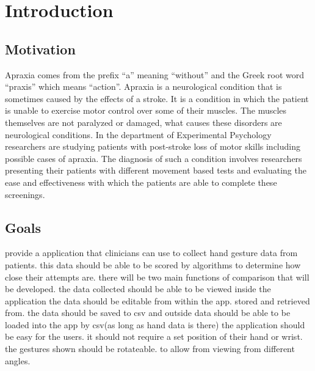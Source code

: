 \chapter{Introduction}

\label{Chapter1_introduction} 

\section{Motivation}
Apraxia comes from the prefix “a” meaning “without” and the  Greek root word “praxis” which means “action”. Apraxia is a neurological condition that is sometimes caused by the effects of a stroke. It is a condition in which the patient is unable to exercise motor control over some of their muscles. The muscles themselves are not paralyzed or damaged, what causes these disorders are neurological conditions. In the department of Experimental Psychology researchers are studying patients with post-stroke loss of motor skills including possible cases of apraxia. The diagnosis of such a condition involves researchers presenting their patients with different movement based tests and evaluating the ease and effectiveness with which the patients are able to complete these screenings.  
	
\section{Goals}

provide a application that clinicians can use to collect hand gesture data from patients. 
this data should be able to be scored by algorithms to determine how close their attempts are.
there will be two main functions of comparison that will be developed. 
the data collected should be able to be viewed inside the application
the data should be editable from within the app.
stored and retrieved from. 
the data should be saved to csv and outside data should be able to be loaded into the app by csv(as long as hand data is there)
the application should be easy for the users. it should not require a set position of their hand or wrist. 
the gestures shown should be rotateable. to allow from viewing from different angles. 



